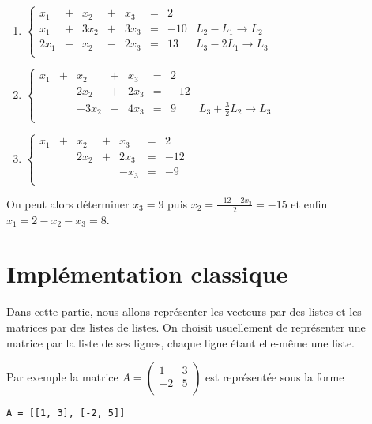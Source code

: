 \begin{enumerate}

\item $\left\{
\begin{matrix}x_1&+&x_2&+&x_3&=&2&\\
x_1&+&3x_2&+&3x_3&=&-10&L_2-L_1 \rightarrow L_2\\
2x_1&-&x_2&-&2x_3&=&13&L_3-2L_1 \rightarrow L_3\\
\end{matrix}\right.$
\item $\left\{
\begin{matrix}x_1&+&x_2&+&x_3&=&2&\\
&& 2x_2&+&2x_3&=&-12&\\
&&-3x_2&-&4x_3&=&9&L_3+\frac 32 L_2 \rightarrow L_3\\
\end{matrix}\right.$

\item $\left\{
\begin{matrix}x_1&+&x_2&+&x_3&=&2&\\
&& 2x_2&+&2x_3&=&-12&\\
&&&&-x_3&=&-9&\\
\end{matrix}\right.$
\end{enumerate}
On peut alors déterminer $x_3=9$ puis $x_2=\frac {-12-2x_3}2=-15$ et enfin $x_1=2-x_2-x_3=8$.
\section{Implémentation classique}
Dans cette partie, nous allons représenter les vecteurs par des listes et les matrices par des listes de listes. On choisit usuellement de représenter une matrice par la liste de ses lignes, chaque ligne étant elle-même une liste.

Par exemple la matrice $A = \begin{pmatrix}1&3\\ -2&5\\\end{pmatrix}$ est représentée sous la forme
\medskip
\begin{lstlisting}
A = [[1, 3], [-2, 5]]
\end{lstlisting}

